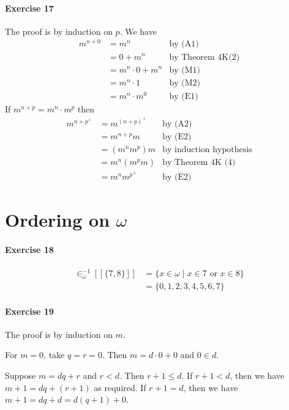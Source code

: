 \documentclass{report}
\begin{document}
    \paragraph{Exercise 17}
    The proof is by induction on $p$. We have
    \begin{align*}
        m^{n + 0} & = m^n & \text{by (A1)} \\
        & = 0 + m^n & \text{by Theorem 4K(2)} \\
        & = m^n \cdot 0 + m^n & \text{by (M1)} \\
        & = m^n \cdot 1 & \text{by (M2)} \\
        & = m^n \cdot m^0 & \text{by (E1)}
    \end{align*}
    If $m^{n+p} = m^n \cdot m^p$ then
    \begin{align*}
        m^{n+p^+} & = m^{(n+p)^+} & \text{by (A2)} \\
        & = m^{n+p} m & \text{by (E2) }\\
        & = (m^n m^p) m & \text{by induction hypothesis} \\
        & = m^n (m^p m) & \text{by Theorem 4K (4)} \\
        & = m^n m^{p^+} & \text{by (E2)}
    \end{align*}

    \section{Ordering on $\omega$}

    \paragraph{Exercise 18}
    \begin{align*}
        \in_\omega^{-1} [\![ \{ 7,8 \} ]\!]
        & = \{ x \in \omega \mid x \in 7 \text{ or } x \in 8 \} \\
        & = \{ 0, 1, 2, 3, 4, 5, 6, 7 \}
    \end{align*}

    \paragraph{Exercise 19}
    The proof is by induction on $m$.

    For $m = 0$, take $q = r = 0$. Then $m = d \cdot 0 + 0$ and $0 \in d$.

    Suppose $m = dq + r$ and $r < d$. Then $r + 1 \leq d$. If $r + 1 < d$, then we have $m + 1 = dq + (r + 1)$ as required.
    If $r + 1 = d$, then we have $m + 1 = dq + d = d(q+1) + 0$.
\end{document}
